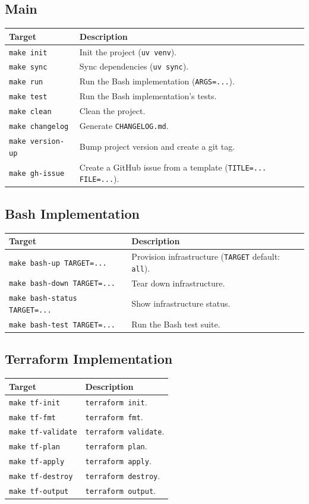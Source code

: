 \documentclass[11pt,a4paper]{report}
\newcommand{\techtable}[3]{%
\begin{center}
\renewcommand{\arraystretch}{1.3}
\begin{tabularx}{\linewidth}{l X}
\toprule
\textbf{#2} & \textbf{#3} \\
\midrule
#1
\bottomrule
\end{tabularx}
\end{center}
}
\begin{document}
\subsection{Main}

\techtable{
\texttt{make init} & Init the project (\texttt{uv venv}). \\
\texttt{make sync} & Sync dependencies (\texttt{uv sync}). \\
\texttt{make run} & Run the Bash implementation (\texttt{ARGS=...}). \\
\texttt{make test} & Run the Bash implementation's tests. \\
\texttt{make clean} & Clean the project. \\
\texttt{make changelog} & Generate \texttt{CHANGELOG.md}. \\
\texttt{make version-up} & Bump project version and create a git tag. \\
\texttt{make gh-issue} & Create a GitHub issue from a template (\texttt{TITLE=... FILE=...}). \\
}{Target}{Description}

\subsection{Bash Implementation}

\techtable{
\texttt{make bash-up TARGET=...} & Provision infrastructure (\texttt{TARGET} default: \texttt{all}). \\
\texttt{make bash-down TARGET=...} & Tear down infrastructure. \\
\texttt{make bash-status TARGET=...} & Show infrastructure status. \\
\texttt{make bash-test TARGET=...} & Run the Bash test suite. \\
}{Target}{Description}

\subsection{Terraform Implementation}

\techtable{
\texttt{make tf-init} & \texttt{terraform init}. \\
\texttt{make tf-fmt} & \texttt{terraform fmt}. \\
\texttt{make tf-validate} & \texttt{terraform validate}. \\
\texttt{make tf-plan} & \texttt{terraform plan}. \\
\texttt{make tf-apply} & \texttt{terraform apply}. \\
\texttt{make tf-destroy} & \texttt{terraform destroy}. \\
\texttt{make tf-output} & \texttt{terraform output}. \\
}{Target}{Description}
\end{document}
